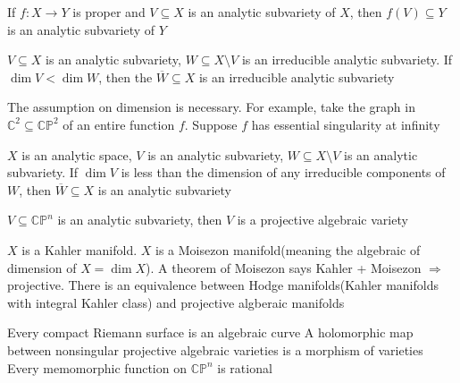 \documentclass[../main.tex]{subfiles}
\begin{document}
\begin{theorem}
If $f:X\to Y$ is proper and $V\subseteq X$ is an analytic subvariety of $X$, then $f(V)\subseteq Y$ is an analytic subvariety of $Y$
\end{theorem}

\begin{theorem}
$V\subseteq X$ is an analytic subvariety, $W\subseteq X\setminus V$ is an irreducible analytic subvariety. If $\dim V<\dim W$, then the $\overline W\subseteq X$ is an irreducible analytic subvariety
\end{theorem}

\begin{remark}
The assumption on dimension is necessary. For example, take the graph in $\mathbb C^2\subseteq \mathbb{CP}^2$ of an entire function $f$. Suppose $f$ has essential singularity at infinity
\end{remark}

\begin{corollary}
$X$ is an analytic space, $V$ is an analytic subvariety, $W\subseteq X\setminus V$ is an analytic subvariety. If $\dim V$ is less than the dimension of any irreducible components of $W$, then $\overline W\subseteq X$ is an analytic subvariety
\end{corollary}

\begin{theorem}
$V\subseteq\mathbb{CP}^n$ is an analytic subvariety, then $V$ is a projective algebraic variety
\end{theorem}

\begin{remark}
$X$ is a Kahler manifold. $X$ is a Moisezon manifold(meaning the algebraic of dimension of $X=\dim X$). A theorem of Moisezon says Kahler + Moisezon $\Rightarrow$ projective. There is an equivalence between Hodge manifolds(Kahler manifolds with integral Kahler class) and projective algberaic manifolds
\end{remark}

\begin{corollary}
Every compact Riemann surface is an algebraic curve
A holomorphic map between nonsingular projective algebraic varieties is a morphism of varieties
Every memomorphic function on $\mathbb{CP}^n$ is rational
\end{corollary}
\end{document}

